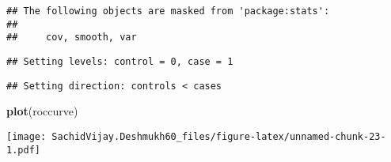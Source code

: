 \documentclass[]{article}
\newenvironment{Shaded}{\begin{snugshade}}{\end{snugshade}}
\newcommand{\DataTypeTok}[1]{\textcolor[rgb]{0.13,0.29,0.53}{#1}}
\newcommand{\KeywordTok}[1]{\textcolor[rgb]{0.13,0.29,0.53}{\textbf{#1}}}
\newcommand{\NormalTok}[1]{#1}
\newcommand{\OperatorTok}[1]{\textcolor[rgb]{0.81,0.36,0.00}{\textbf{#1}}}
\newcommand{\OtherTok}[1]{\textcolor[rgb]{0.56,0.35,0.01}{#1}}
\newcommand{\StringTok}[1]{\textcolor[rgb]{0.31,0.60,0.02}{#1}}
\begin{document}
\begin{verbatim}
## The following objects are masked from 'package:stats':
## 
##     cov, smooth, var
\end{verbatim}

\begin{Shaded}
\end{Shaded}

\begin{verbatim}
## Setting levels: control = 0, case = 1
\end{verbatim}

\begin{verbatim}
## Setting direction: controls < cases
\end{verbatim}

\begin{Shaded}
\begin{Highlighting}[]
\KeywordTok{plot}\NormalTok{(roccurve)}
\end{Highlighting}
\end{Shaded}

\texttt{[image: SachidVijay.Deshmukh60\_files/figure-latex/unnamed-chunk-23-1.pdf]}
\end{document}
